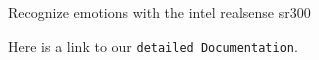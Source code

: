 Recognize emotions with the intel realsense sr300

Here is a link to our {\tt detailed Documentation}. 